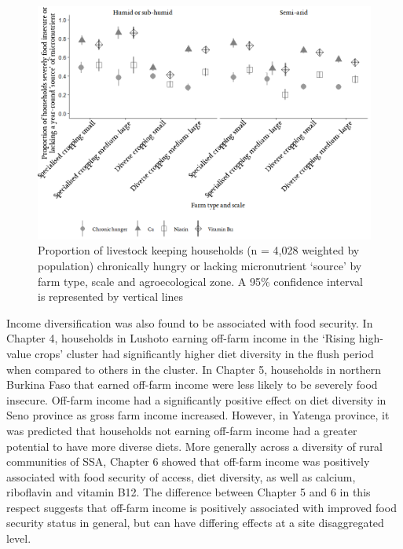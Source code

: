 \begin{figure}[H]
\includegraphics[width=1\textwidth]{figs_07/prevalence_weighted2.png}
  \captionsetup{singlelinecheck = false, justification=justified} %
  \caption{Proportion of livestock keeping households (n = 4,028 weighted by population) chronically hungry or lacking micronutrient `source' by farm type, scale and agroecological zone. A 95\% confidence interval is represented by vertical lines}
  \label{fig:07_2}
  \small

\end{figure}

Income diversification was also found to be associated with food security. In Chapter 4, households in Lushoto earning off-farm income in the `Rising high-value crops' cluster had significantly higher diet diversity in the flush period when compared to others in the cluster. In Chapter 5, households in northern Burkina Faso that earned off-farm income were less likely to be severely food insecure. Off-farm income had a significantly positive effect on diet diversity in Seno province as gross farm income increased. However, in Yatenga province, it was predicted that households not earning off-farm income had a greater potential to have more diverse diets. More generally across a diversity of rural communities of SSA, Chapter 6 showed that off-farm income was positively associated with food security of access, diet diversity, as well as calcium, riboflavin and vitamin B12. The difference between Chapter 5 and 6 in this respect suggests that off-farm income is positively associated with improved food security status in general, but can have differing effects at a site disaggregated level.

